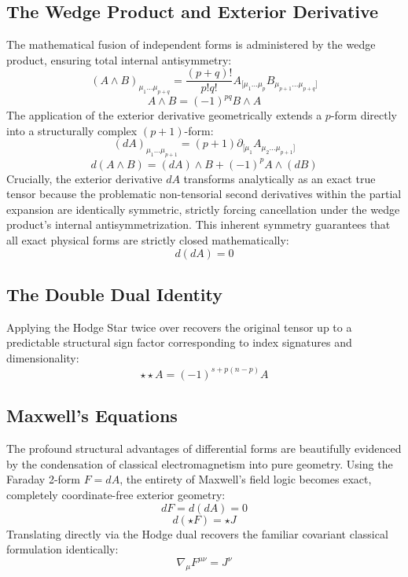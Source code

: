 \documentclass[11pt, a4paper]{report}
\begin{document}
\subsection*{The Wedge Product and Exterior Derivative}
The mathematical fusion of independent forms is administered by the wedge product, ensuring total internal antisymmetry:
\begin{equation} (A \wedge B)_{\mu_1 \dots \mu_{p+q}} = \frac{(p+q)!}{p!q!} A_{[\mu_1 \dots \mu_p} B_{\mu_{p+1} \dots \mu_{p+q}]} \end{equation}
\begin{equation} A \wedge B = (-1)^{pq} B \wedge A \end{equation}
The application of the exterior derivative geometrically extends a $p$-form directly into a structurally complex $(p+1)$-form:
\begin{equation} (dA)_{\mu_1 \dots \mu_{p+1}} = (p+1) \partial_{[\mu_1} A_{\mu_2 \dots \mu_{p+1}]} \end{equation}
\begin{equation} d(A \wedge B) = (dA) \wedge B + (-1)^p A \wedge (dB) \end{equation}
Crucially, the exterior derivative $dA$ transforms analytically as an exact true tensor because the problematic non-tensorial second derivatives within the partial expansion are identically symmetric, strictly forcing cancellation under the wedge product's internal antisymmetrization. This inherent symmetry guarantees that all exact physical forms are strictly closed mathematically:
\begin{equation} d(dA) = 0 \end{equation}

\subsection*{The Double Dual Identity}
Applying the Hodge Star twice over recovers the original tensor up to a predictable structural sign factor corresponding to index signatures and dimensionality:
\begin{equation} \star\star A = (-1)^{s + p(n-p)} A \end{equation}

\subsection*{Maxwell's Equations}
The profound structural advantages of differential forms are beautifully evidenced by the condensation of classical electromagnetism into pure geometry. Using the Faraday 2-form $F = dA$, the entirety of Maxwell's field logic becomes exact, completely coordinate-free exterior geometry:
\begin{equation} dF = d(dA) = 0 \end{equation}
\begin{equation} d(\star F) = \star J \end{equation}
Translating directly via the Hodge dual recovers the familiar covariant classical formulation identically:
\begin{equation} \nabla_\mu F^{\mu\nu} = J^\nu \end{equation}
\end{document}
